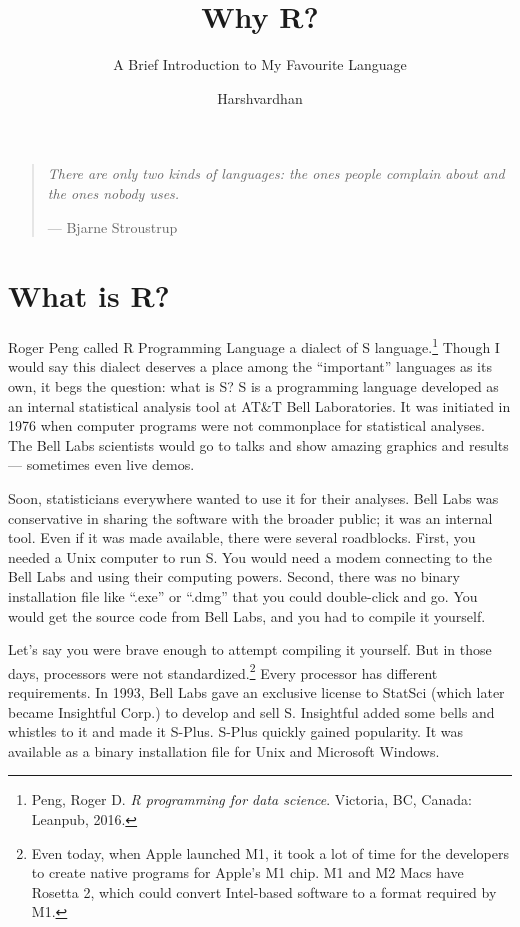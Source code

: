\documentclass[
  letterpaper,
  DIV=11,
  numbers=noendperiod]{scrartcl}
\title{Why R?}
\subtitle{A Brief Introduction to My Favourite Language}
\author{Harshvardhan}
\date{}
\begin{document}
\maketitle
\ifdefined\Shaded\renewenvironment{Shaded}{\begin{tcolorbox}[frame hidden, borderline west={3pt}{0pt}{shadecolor}, interior hidden, sharp corners, boxrule=0pt, breakable, enhanced]}{\end{tcolorbox}}\fi

\begin{quote}
\emph{There are only two kinds of languages: the ones people complain
about and the ones nobody uses.}

--- Bjarne Stroustrup
\end{quote}

\hypertarget{what-is-r}{%
\section{What is R?}\label{what-is-r}}

Roger Peng called R Programming Language a dialect of S
language.\footnote{Peng, Roger D. \emph{R programming for data science}.
  Victoria, BC, Canada: Leanpub, 2016.} Though I would say this dialect
deserves a place among the ``important'' languages as its own, it begs
the question: what is S? S is a programming language developed as an
internal statistical analysis tool at AT\&T Bell Laboratories. It was
initiated in 1976 when computer programs were not commonplace for
statistical analyses. The Bell Labs scientists would go to talks and
show amazing graphics and results --- sometimes even live demos.

Soon, statisticians everywhere wanted to use it for their analyses. Bell
Labs was conservative in sharing the software with the broader public;
it was an internal tool. Even if it was made available, there were
several roadblocks. First, you needed a Unix computer to run S. You
would need a modem connecting to the Bell Labs and using their computing
powers. Second, there was no binary installation file like ``.exe'' or
``.dmg'' that you could double-click and go. You would get the source
code from Bell Labs, and you had to compile it yourself.

Let's say you were brave enough to attempt compiling it yourself. But in
those days, processors were not standardized.\footnote{Even today, when
  Apple launched M1, it took a lot of time for the developers to create
  native programs for Apple's M1 chip. M1 and M2 Macs have Rosetta 2,
  which could convert Intel-based software to a format required by M1.}
Every processor has different requirements. In 1993, Bell Labs gave an
exclusive license to StatSci (which later became Insightful Corp.) to
develop and sell S. Insightful added some bells and whistles to it and
made it S-Plus. S-Plus quickly gained popularity. It was available as a
binary installation file for Unix and Microsoft Windows.
\end{document}
